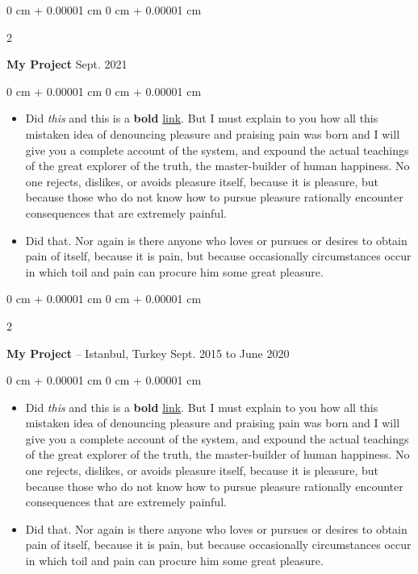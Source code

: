 \documentclass[10pt, letterpaper]{article}
\newenvironment{highlights}{
    \begin{itemize}[
        topsep=0.10 cm,
        parsep=0.10 cm,
        partopsep=0pt,
        itemsep=0pt,
        leftmargin=0 cm + 10pt
    ]
}{
    \end{itemize}
} %
\newenvironment{onecolentry}{
    \begin{adjustwidth}{
        0 cm + 0.00001 cm
    }{
        0 cm + 0.00001 cm
    }
}{
    \end{adjustwidth}
} %
\newenvironment{twocolentry}[2][]{
    \onecolentry
    \def\secondColumn{#2}
    \setcolumnwidth{\fill, 4.5 cm}
    \begin{paracol}{2}
}{
    \switchcolumn \raggedleft \secondColumn
    \end{paracol}
    \endonecolentry
} %
\begin{document}
        \vspace{0.2 cm}

        \begin{twocolentry}{
            Sept. 2021
        }
            \textbf{My Project}\end{twocolentry}

        \vspace{0.10 cm}
        \begin{onecolentry}
            \begin{highlights}
                \item Did \textit{this} and this is a \textbf{bold} \href{https://example.com}{link}. But I must explain to you how all this mistaken idea of denouncing pleasure and praising pain was born and I will give you a complete account of the system, and expound the actual teachings of the great explorer of the truth, the master-builder of human happiness. No one rejects, dislikes, or avoids pleasure itself, because it is pleasure, but because those who do not know how to pursue pleasure rationally encounter consequences that are extremely painful.
                \item Did that. Nor again is there anyone who loves or pursues or desires to obtain pain of itself, because it is pain, but because occasionally circumstances occur in which toil and pain can procure him some great pleasure.
            \end{highlights}
        \end{onecolentry}


        \vspace{0.2 cm}

        \begin{twocolentry}{
            Sept. 2015 to June 2020
        }
            \textbf{My Project} -- Istanbul, Turkey\end{twocolentry}

        \vspace{0.10 cm}
        \begin{onecolentry}
            \begin{highlights}
                \item Did \textit{this} and this is a \textbf{bold} \href{https://example.com}{link}. But I must explain to you how all this mistaken idea of denouncing pleasure and praising pain was born and I will give you a complete account of the system, and expound the actual teachings of the great explorer of the truth, the master-builder of human happiness. No one rejects, dislikes, or avoids pleasure itself, because it is pleasure, but because those who do not know how to pursue pleasure rationally encounter consequences that are extremely painful.
                \item Did that. Nor again is there anyone who loves or pursues or desires to obtain pain of itself, because it is pain, but because occasionally circumstances occur in which toil and pain can procure him some great pleasure.
            \end{highlights}
        \end{onecolentry}
\end{document}

